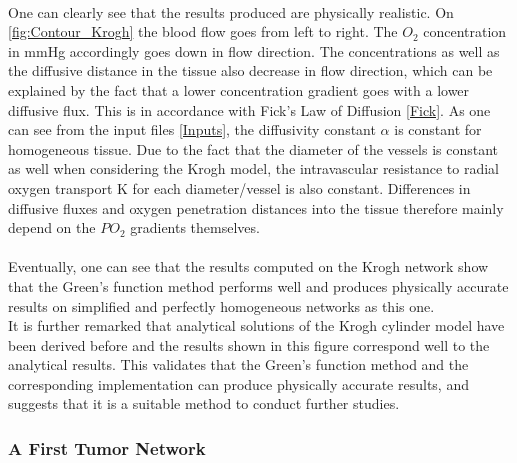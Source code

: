 \\One can clearly see that the results produced are physically realistic. On \ref{fig:Contour_Krogh} the blood flow goes from left to right. The $O_2$ concentration in mmHg accordingly goes down in flow direction. The concentrations as well as the diffusive distance in the tissue also decrease in flow direction, which can be explained by the fact that a lower concentration gradient goes with a lower diffusive flux. This is in accordance with Fick's Law of Diffusion \ref{Fick}. As one can see from the input files \ref{Inputs}, the diffusivity constant $\alpha$ is constant for homogeneous tissue. Due to the fact that the diameter of the vessels is constant as well when considering the Krogh model, the intravascular resistance to radial oxygen transport K for each diameter/vessel is also constant. Differences in diffusive fluxes and oxygen penetration distances into the tissue therefore mainly depend on the $PO_2$ gradients themselves.\\
\\Eventually, one can see that the results computed on the Krogh network show that the Green's function method performs well and produces physically accurate results on simplified and perfectly homogeneous networks as this one.
\\It is further remarked that analytical solutions of the Krogh cylinder model have been derived before and the results shown in this figure correspond well to the  analytical results. This validates that the Green's function method and the corresponding implementation can produce physically accurate results, and suggests that it is a suitable method to conduct further studies.

\newpage
\subsubsection*{A First Tumor Network}

